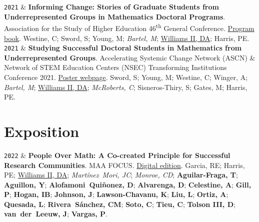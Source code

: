\documentclass[10pt,a4paper]{article}
\newcommand{\LastName}{Williams II}
\newcommand{\Initials}{DA}
\newcommand{\Me}{\underline{\LastName, \Initials}}  %
\newcommand{\PEH}{Harris, PE}
\newcommand{\Rebecca}{Garcia, RE}
\newcommand{\Yasmin}{Aguillon, Y}
\newcommand{\Dylan}{Alvarenga, D}
\newcommand{\Carlos}{Mart\'{i}nez~Mori, JC}
\newcommand{\Cas}{Monroe, CD}
\newcommand{\Camelle}{Tieu, C}
\newcommand{\Michael}{Young, M}
\newcommand{\Sarah}{Sword, S}
\newcommand{\Aris}{Winger, A}
\newcommand{\Christian}{McRoberts, C}
\newcommand{\Maya}{Bartel, M}
\newcommand{\Simone}{Sisneros-Thiry, S}
\newcommand{\Miriam}{Gates, M}
\newcommand{\Carl}{Westine, C}
\newcommand{\Imhotep}{Hogan, IB}
\newcommand{\Tomas}{Aguilar-Fraga, T}
\newcommand{\Daniel}{Alofamoni~Quiñonez, D}
\newcommand{\Aalliyah}{Celestine, A}
\newcommand{\Parneet}{Gill, P}
\newcommand{\Jakeyl}{Johnson, J}
\newcommand{\Kobe}{Lawson-Chavanu, K}
\newcommand{\Lina}{Liu, L}
\newcommand{\Aaron}{Ortiz, A}
\newcommand{\Lauren}{Quesada, L}
\newcommand{\Cynthia}{Rivera~Sánchez, CM}
\newcommand{\Christopher}{Soto, C}
\newcommand{\Dirk}{Tolson III, D}
\newcommand{\Jacob}{van~der~Leeuw, J}
\newcommand{\Pamela}{Vargas, P}
\newcommand{\UGCollab}[1]{\textbf{#1}}
\newcommand{\GradCollab}[1]{\textit{#1}}
\newcommand{\Year}[1]{\fontsize{10pt}{0}\selectfont \texttt{#1}}
\newcommand{\DOI}[1]{DOI: \href{https://doi.org/#1}{#1}}
\newcommand{\GitHub}[1]{GitHub: \href{https://github.com/#1}{#1}}
\begin{document}
\begin{EntriesTableYear}
\Year{2021}  &
  \textbf{Informing Change: Stories of Graduate Students from Underrepresented Groups in Mathematics Doctoral Programs}.
  \newline
  Association for the Study of Higher Education 46\textsuperscript{th} General Conference. \href{https://www.ashe.ws//Files/Past Conferences/ASHE 2021 Program Book.pdf}{Program book}.
  \newline
  \Carl; \Sarah; \Michael; \GradCollab{\Maya}; \Me; \PEH.
  \\
\Year{2021}  &
  \textbf{Studying Successful Doctoral Students in Mathematics from Underrepresented Groups}.
  \newline
  Accelerating Systemic Change Network (ASCN) \& Network of STEM Education Centers (NSEC) Transforming Institutions Conference 2021. \href{https://ascnhighered.org/ASCN/transforming_institutions/2021/program/posters/session_c/2/243631.html}{Poster webpage}.
  \newline
  \Sarah; \Michael; \Carl; \Aris; \GradCollab{\Maya}; \Me; \GradCollab{\Christian}; \Simone; \Miriam; \PEH.
 \end{EntriesTableYear}
\section{Exposition}

\begin{EntriesTableYear}
\Year{2022}  &
  \textbf{People Over Math: A Co-created Principle for Successful Research Communities}.
  \newline
  MAA FOCUS.
  \href{http://digitaleditions.walsworthprintgroup.com/publication/?m=7656\&i=749450\&p=26\&fbclid=IwAR19q6M4ZQ1I8uncyU-iuGHsHfz-6JHFiZFHrg9thmyGqXAESJYRlaHXijc\&ver=html5}{Digital edition}.
  \newline
  \Rebecca; \PEH; \Me; \GradCollab{\Carlos}; \GradCollab{\Cas}; \UGCollab{\Tomas}; \UGCollab{\Yasmin}; \UGCollab{\Daniel}; \UGCollab{\Dylan}; \UGCollab{\Aalliyah}; \UGCollab{\Parneet}; \UGCollab{\Imhotep}; \UGCollab{\Jakeyl}; \UGCollab{\Kobe}; \UGCollab{\Lina}; \UGCollab{\Aaron}; \UGCollab{\Lauren}; \UGCollab{\Cynthia}; \UGCollab{\Christopher}; \UGCollab{\Camelle}; \UGCollab{\Dirk}; \UGCollab{\Jacob}; \UGCollab{\Pamela}.
 \end{EntriesTableYear}
\end{document}
